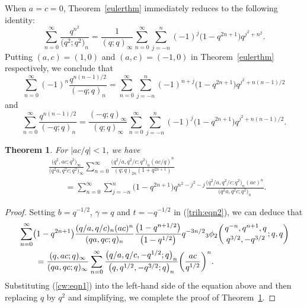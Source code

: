 \documentclass[10pt,a4paper]{amsart}
\numberwithin{equation}{section}
\newtheorem{Theorem}{Theorem}[section]
\begin{document}
When $a=c=0$, Theorem~\ref{eulerthm} immediately reduces to the following identity:
\begin{equation*}%
	\sum_{n=0}^\infty \frac {q^{n^2}}{\bigl(q^2; q^2\bigr)_n}
	=\frac{1}{(q; q)_\infty}
	\sum_{n=0}^\infty \sum_{j=-n}^n (-1)^j \bigl(1-q^{2n+1}\bigr) q^{j^2+n^2}.
\end{equation*}	
Putting $(a, c)=(1, 0)$ and $(a, c)=(-1, 0)$ in Theorem~\ref{eulerthm} respectively, we conclude that
\begin{equation*}%
	\sum_{n=0}^\infty (-1)^n \frac{q^{n(n-1)/2}}{(-q; q)_n}
	=\sum_{n=0}^\infty \sum_{j=-n}^n (-1)^{n+j} \bigl(1-q^{2n+1}\bigr) q^{j^2+n(n-1)/2}
\end{equation*}
and
\begin{equation*}%
	\sum_{n=0}^\infty \frac{q^{n(n-1)/2}}{(-q; q)_n}
	=\frac{(-q; q)_\infty}{(q; q)_\infty}\sum_{n=0}^\infty \sum_{j=-n}^n (-1)^{j} \bigl(1-q^{2n+1}\bigr) q^{j^2+n(n-1)/2}.
\end{equation*}

\begin{Theorem}\label{liuoldthm} For $|ac/q|<1$, we have
	\begin{align*}%
		&\frac{\bigl(q^2, ac; q^2\bigr)_\infty}{\bigl(q^2 a, q^2 c; q^2\bigr)_\infty}
		\sum_{n=0}^\infty \frac{\bigl(q^2/a, q^2/c; q^2\bigr)_n (ac/q)^n}{(q; q)_{2n} (1+q^{2n+1})}\\
		&\qquad{}=\sum_{n=0}^\infty \sum_{j=-n}^n \bigl(1-q^{2n+1}\bigr) q^{n^2-j^2-j}
		\frac{\bigl(q^2/a, q^2/c; q^2\bigr)_n (ac)^n}{\bigl(q^2 a, q^2 c; q^2\bigr)_n}.\nonumber
	\end{align*}
\end{Theorem}
\begin{proof} Setting $b=q^{-1/2}$, $\gamma=q$ and $t=-q^{-1/2}$ in (\ref{trih:eqn2}), we can deduce that
	\begin{align*}
		&\sum_{n=0}^\infty \bigl(1-q^{2n+1}\bigr)\frac{(q/a, q/c)_n (ac)^n}{(qa, qc; q)_n}
		\frac{\bigl(1-q^{n+1/2}\bigr)}{\bigl(1-q^{1/2}\bigr)} q^{-3n/2}{_3\phi_2}\biggl({{q^{-n}, q^{n+1}, q}\atop{q^{3/2}, -q^{3/2}}}; q, q\biggr)\\
		&\qquad =\frac{(q, ac; q)_\infty}{(qa, qc; q)_\infty}
		\sum_{n=0}^\infty \frac{\bigl(q/a, q/c, -q^{1/2}; q\bigr)_n}{\bigl(q, q^{1/2}, -q^{3/2}; q\bigr)_n}\biggl(\frac{ac}{q^{1/2}}\biggr)^n.
	\end{align*}
	Substituting (\ref{cw:eqn1}) into the left-hand side of the equation above and then replacing $q$ by $q^2$ and simplifying, we complete the proof of Theorem~\ref{liuoldthm}.
\end{proof}
\end{document}
